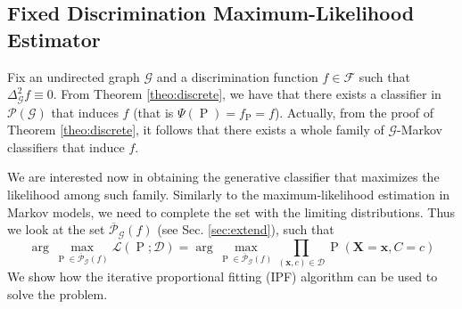 \documentclass[11pt,a4paper, twoside]{book}
\newtheorem{conjecture}{Conjecture}[chapter]
\newcommand{\Pp}{\operatorname{P}}
\newcommand{\bx}{\mathbf{x}}
\newcommand{\bX}{\mathbf{X}}
\newcommand{\by}{\mathbf{y}}
\newcommand{\bchi}{\boldsymbol{\mathcal{X}}}
\begin{document}
%
%
%
%
%
%

\subsection{Fixed Discrimination Maximum-Likelihood Estimator}

Fix an undirected graph $\mathcal{G}$ and a discrimination function $f \in \mathcal{F}$ such that $\Delta^{2}_{\mathcal{G}}f\equiv 0$. 
From Theorem \ref{theo:discrete}, we have that there exists a classifier in $\mathcal{P}(\mathcal{G})$ that induces $f$ (that is $\Psi(\Pp)=f_{\Pp}=f$). Actually, from the proof of Theorem \ref{theo:discrete}, it follows that there exists a whole family of $\mathcal{G}$-Markov classifiers that induce $f$.  

We are interested now in obtaining the generative classifier that maximizes the likelihood among such family. Similarly to the maximum-likelihood estimation in Markov models, we need to complete the set with the limiting distributions. Thus we look at the set $\overline{\mathcal{P}}_{\mathcal{G}}(f)$ (see Sec. \ref{sec:extend}), such that 
$$ \arg \max_{\Pp\in \overline{\mathcal{P}}_{\mathcal{G}}(f)} \mathcal{L}(\Pp;\mathcal{D}) = \arg \max_{\Pp\in \overline{\mathcal{P}}_{\mathcal{G}}(f)}\prod_{(\bx,c) \in \mathcal{D}} \Pp(\bX=\bx, C=c)$$
We show how the iterative proportional fitting (IPF) algorithm \citep{fienbergIPF70, lauritzen1996} can be used to solve the problem.
\end{document}

